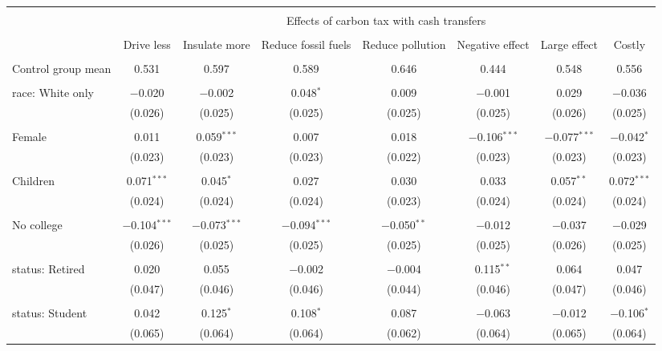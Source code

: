 
\begin{tabular}{@{\extracolsep{5pt}}lccccccc} 
\\[-1.8ex]\hline 
\hline \\[-1.8ex] 
 & \multicolumn{7}{c}{Effects of carbon tax with cash transfers} \\ 
\cline{2-8} 
\\[-1.8ex] & Drive less & Insulate more & Reduce fossil fuels & Reduce pollution & Negative effect & Large effect & Costly \\ 
\hline \\[-1.8ex] 
 Control group mean & 0.531 & 0.597 & 0.589 & 0.646 & 0.444 & 0.548 & 0.556  \\ \hline \\[-1.8ex] race: White only & $-$0.020 & $-$0.002 & 0.048$^{*}$ & 0.009 & $-$0.001 & 0.029 & $-$0.036 \\ 
  & (0.026) & (0.025) & (0.025) & (0.025) & (0.025) & (0.026) & (0.025) \\ 
  & & & & & & & \\ 
 Female & 0.011 & 0.059$^{***}$ & 0.007 & 0.018 & $-$0.106$^{***}$ & $-$0.077$^{***}$ & $-$0.042$^{*}$ \\ 
  & (0.023) & (0.023) & (0.023) & (0.022) & (0.023) & (0.023) & (0.023) \\ 
  & & & & & & & \\ 
 Children & 0.071$^{***}$ & 0.045$^{*}$ & 0.027 & 0.030 & 0.033 & 0.057$^{**}$ & 0.072$^{***}$ \\ 
  & (0.024) & (0.024) & (0.024) & (0.023) & (0.024) & (0.024) & (0.024) \\ 
  & & & & & & & \\ 
 No college & $-$0.104$^{***}$ & $-$0.073$^{***}$ & $-$0.094$^{***}$ & $-$0.050$^{**}$ & $-$0.012 & $-$0.037 & $-$0.029 \\ 
  & (0.026) & (0.025) & (0.025) & (0.025) & (0.025) & (0.026) & (0.025) \\ 
  & & & & & & & \\ 
 status: Retired & 0.020 & 0.055 & $-$0.002 & $-$0.004 & 0.115$^{**}$ & 0.064 & 0.047 \\ 
  & (0.047) & (0.046) & (0.046) & (0.044) & (0.046) & (0.047) & (0.046) \\ 
  & & & & & & & \\ 
 status: Student & 0.042 & 0.125$^{*}$ & 0.108$^{*}$ & 0.087 & $-$0.063 & $-$0.012 & $-$0.106$^{*}$ \\ 
  & (0.065) & (0.064) & (0.064) & (0.062) & (0.064) & (0.065) & (0.064) \\ 

\end{tabular}
